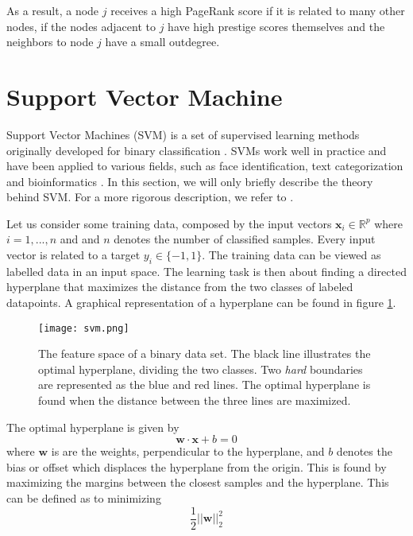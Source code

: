 As a result, a node $j$ receives a high PageRank score if it is related to many other nodes, if the nodes adjacent to $j$ have high prestige scores themselves and the neighbors to node $j$ have a small outdegree. 


\section{Support Vector Machine}
Support Vector Machines (SVM) is a set of supervised learning methods originally developed for binary classification \citep{Hsu2002}. SVMs work well in practice and have been applied to various fields, such as face identification, text categorization and bioinformatics \citep{campbell2011}. In this section, we will only briefly describe the theory behind SVM. For a more rigorous description, we refer to \citep{Kecman2005,Cortes1995,campbell2011}.

Let us consider some training data, composed by the input vectors $\bm{x}_i\in \mathds{R}^p$ where $i=1,...,n$ and and $n$ denotes the number of classified samples. Every input vector is related to a target $y_i \in \{-1,1\}$. The training data can be viewed as labelled data in an input space. The learning task is then about finding a directed hyperplane that maximizes the distance from the two classes of labeled datapoints. A graphical representation of a hyperplane can be found in figure \ref{svm}. 

\begin{figure}[h!]
    \centering
    \texttt{[image: svm.png]}
    \caption{The feature space of a binary data set. The black line illustrates the optimal hyperplane, dividing the two classes. Two \textit{hard} boundaries are represented as the blue and red lines. The optimal hyperplane is found when the distance between the three lines are maximized.}
    \label{svm}
\end{figure}

The optimal hyperplane is given by \citep{campbell2011}
\begin{equation}
    \bm{w}\cdot\bm{x}+b=0
\end{equation}
where $\bm{w}$ is are the weights, perpendicular to the hyperplane, and $b$ denotes the bias or offset which displaces the hyperplane from the origin. This is found by maximizing the margins between the closest samples and the hyperplane. This can be defined as to minimizing $$\frac{1}{2}||\bm{w}||_2^2$$

